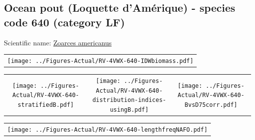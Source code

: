 \documentclass[12pt]{article}\usepackage[]{graphicx}\usepackage[]{color}
\begin{document}
\renewcommand\thefigure{\thesubsection\Alph{figure}}

\setcounter{figure}{0}

\hypertarget{sec:640}{%
\subsection{Ocean pout (Loquette d'Amérique) - species code 640 (category LF)}\label{sec:640}}

  


Scientific name: \href{http://www.marinespecies.org/aphia.php?p=taxdetails\&id=159267}{Zoarces americanus} \newline
\begin{minipage}{1.0\textwidth}
 \begin{tabular}{c}
\texttt{[image: ../Figures-Actual/RV-4VWX-640-IDWbiomass.pdf]} \\ 
\end{tabular} 
\end{minipage}
\newline

\vspace{1cm}
\begin{minipage}{1.0\textwidth}
 \begin{tabular}{ccc}
\texttt{[image: ../Figures-Actual/RV-4VWX-640-stratifiedB.pdf]} & 
\texttt{[image: ../Figures-Actual/RV-4VWX-640-distribution-indices-usingB.pdf]} & 
\texttt{[image: ../Figures-Actual/RV-4VWX-640-BvsD75corr.pdf]} \\ 
\end{tabular} 
\end{minipage}
\clearpage
\begin{minipage}{1.0\textwidth}
 \begin{tabular}{c}
\texttt{[image: ../Figures-Actual/RV-4VWX-640-lengthfreqNAFO.pdf]} \\ 
\end{tabular} 
\end{minipage}
\newline
\end{document}
